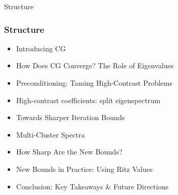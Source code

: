 \begin{frame}[label=toc]{Structure}
    \frametitle{Structure}
    \begin{itemize}
        \item Introducing CG
        \item How Does CG Converge? The Role of Eigenvalues
        \item Preconditioning: Taming High-Contrast Problems
        \item High-contrast coefficients: split eigenspectrum
        \item Towards Sharper Iteration Bounds
        \item Multi-Cluster Spectra
        \item How Sharp Are the New Bounds?
        \item New Bounds in Practice: Using Ritz Values
        \item Conclusion: Key Takeaways \& Future Directions
    \end{itemize}
\end{frame}

